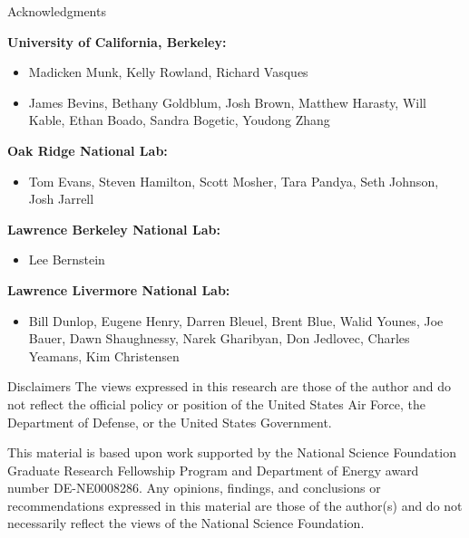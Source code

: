 \documentclass[xcolor=x11names,compress]{beamer}
\renewcommand{\(}{\begin{columns}}
\renewcommand{\)}{\end{columns}}
\newcommand{\<}[1]{\begin{column}{#1}}
\renewcommand{\>}{\end{column}}
\begin{document}
\begin{frame}{Acknowledgments }
 	  \footnotesize{\textbf{University of California, Berkeley:}
	  \begin{itemize}
	    \item Madicken Munk, Kelly Rowland, Richard Vasques
	    \item James Bevins, Bethany Goldblum, Josh Brown, Matthew Harasty, Will Kable, Ethan Boado, Sandra Bogetic, Youdong Zhang
	  \end{itemize}
	  
	  \textbf{Oak Ridge National Lab:}
	    \begin{itemize}
	      \item Tom Evans, Steven Hamilton, Scott Mosher, Tara Pandya, Seth Johnson, Josh Jarrell
	    \end{itemize}
	    
	  \textbf{Lawrence Berkeley National Lab:}
	    \begin{itemize}
	      \item Lee Bernstein
	    \end{itemize}
	    
	  \textbf{Lawrence Livermore National Lab:}
	  \begin{itemize}
	    \item Bill Dunlop, Eugene Henry, Darren Bleuel, Brent Blue, Walid Younes, Joe Bauer, Dawn Shaughnessy, Narek Gharibyan, Don Jedlovec, Charles Yeamans, Kim Christensen 
	  \end{itemize}}
\end{frame}

\begin{frame}{Disclaimers}
\centering  
The views expressed in this research are those of the author and do not reflect the official policy or position of the United States Air Force, the Department of Defense, or the United States Government. \newline
\vspace{0.5cm}  

This material is based upon work supported by the National Science Foundation Graduate Research Fellowship Program and Department of Energy award number DE-NE0008286. Any opinions, findings, and conclusions or recommendations expressed in this material are those of the author(s) and do not necessarily reflect the views of the National Science Foundation.
\end{frame}
\end{document}
